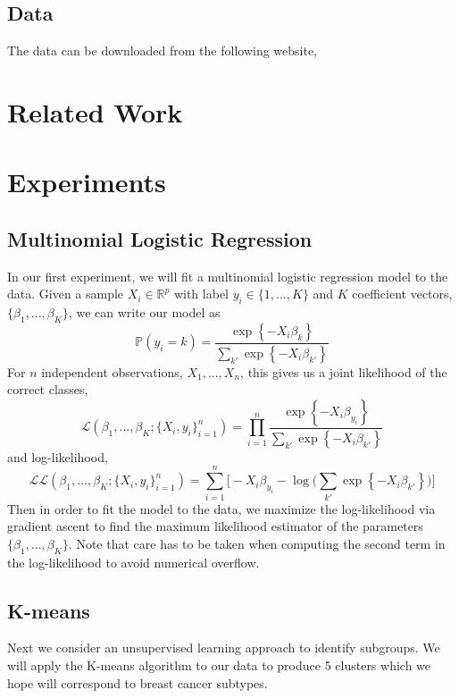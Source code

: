 \documentclass{article}
\begin{document}
\subsection{Data}
The data can be downloaded from the following website,
\begin{center}
\url{}
\end{center}

\section{Related Work}
\label{related_work}

\section{Experiments}
\label{experiments}

\subsection{Multinomial Logistic Regression}
In our first experiment, we will fit a multinomial logistic regression model to the data. Given a sample $X_i \in \mathbb{R}^p$ with label $y_i \in \{1, ..., K\}$ and $K$ coefficient vectors, $\{\beta_1, ..., \beta_K\}$, we can write our model as
\[ \mathbb{P}(y_i = k) = \frac{\exp\left\{-X_i\beta_k\right\}}{\sum_{k'} \exp\left\{-X_i\beta_{k'}\right\}} \]
For $n$ independent observations, $X_1, ..., X_n$, this gives us a joint likelihood of the correct classes,
\[ \mathcal{L}(\beta_1, ..., \beta_K; \{X_i, y_i\}_{i=1}^n) = \prod\limits_{i=1}^n \frac{\exp\left\{-X_i \beta_{y_i}\right\}}{\sum_{k'} \exp\left\{-X_i \beta_{k'}\right\}} \]
and log-likelihood,
\[ \mathcal{LL}(\beta_1, ..., \beta_K; \{X_i, y_i\}_{i=1}^n) = \sum\limits_{i=1}^n\bigg[ -X_i \beta_{y_i} - \log\bigg(\sum\limits_{k'} \exp\left\{-X_i \beta_{k'}\right\}\bigg)\bigg] \]
Then in order to fit the model to the data, we maximize the log-likelihood via gradient ascent to find the maximum likelihood estimator of the parameters $\{\beta_1, ..., \beta_K\}$. Note that care has to be taken when computing the second term in the log-likelihood to avoid numerical overflow.

\subsection{K-means}
Next we consider an unsupervised learning approach to identify subgroups. We will apply the K-means algorithm to our data to produce 5 clusters which we hope will correspond to breast cancer subtypes.
\end{document}
